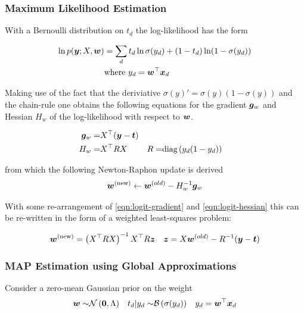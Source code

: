 \subsubsection*{Maximum Likelihood Estimation}
With a Bernoulli distribution on $t_d$ the log-likelihood has the form

\begin{equation}
\begin{aligned}
\ln p(\bm y; X, \bm w) & = \sum_d t_d \ln \sigma(y_d) + (1 - t_d) \ln (1 - \sigma(y_d)) \\
& \text{where } y_d = \bm w^\top\bm x_d
\end{aligned}
\end{equation}

Making use of the fact that the deriviative $\sigma(y)' = \sigma(y)(1 - \sigma(y))$ and the chain-rule one obtains the following equations for the gradient $\bm g_w$ and Hessian $H_w$ of the log-likelihood with respect to $\bm w$.

\begin{align}
\bm g_w = & X^\top (\bm y - \bm t) \label{eqn:logit-gradient}\\
H_w      = & X^\top R X & R = & \text{diag} \left( {y_d (1 - y_d)} \right) \label{eqn:logit-hessian}
\end{align}

from which the following Newton-Raphon update is derived
\begin{align}
\bm w^{(\text{new})} \leftarrow \bm w^{(old)} - H_w^{-1} \bm g_w
\end{align}

With some re-arrangement of \eqref{eqn:logit-gradient} and \eqref{eqn:logit-hessian} this can be re-written in the form of a weighted least-squares problem:

\begin{align}
\bm w^{(\text{new})} & = \left(X^\top R X \right)^{-1} X^\top R \bm z & \bm z = X \bm w^{(old)}-R^{-1}(\bm y - \bm t)
\end{align}


\subsubsection*{MAP Estimation using Global Approximations}
\newcommand \wmap[0] { \vv{w}_{\text{\tiny \sc MAP}} }

Consider a zero-mean Gaussian prior on the weight
\begin{align}\bm w \sim & \mathcal{N} \left( {\bm 0}, {\Lambda} \right) &
t_d | y_d \sim & \mathcal{B}\left( \sigma(y_d) \right) & 
y_d = \bm w^\top\bm x_d  \label{eqn:bayes-logit-model}
\end{align}

